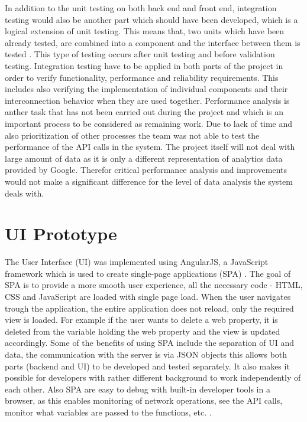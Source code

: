 In addition to the unit testing on both back end and front end, integration testing would also be another part which should have been developed, which is a logical extension of unit testing. This means that, two units which have been already tested, are combined into a component and the interface between them is tested \cite{Integ86:online}. This type of testing occurs after unit testing and before validation testing. Integration testing have to be applied in both parts of the project in order to verify functionality, performance and reliability requirements. This includes also verifying the implementation of individual components and their interconnection behavior when they are used together.
Performance analysis is anther task that has not been carried out during the project and which is an important process to be considered as remaining work. Due to lack of time and also prioritization of other processes the team was not able to test the performance of the API calls in the system. The project itself will not deal with large amount of data as it is only a different representation of analytics data provided by Google. Therefor critical performance analysis and improvements would not make a significant difference for the level of data analysis the system deals with.
\section{UI Prototype}
\label{sec:angularImpl}
The User Interface (UI) was implemented using AngularJS, a JavaScript framework which is used to create single-page applications (SPA) \cite{Angul93:online}.
The goal of SPA is to provide a more smooth user experience, all the necessary code - HTML, CSS and JavaScript are loaded with single page load. When the user navigates trough the application, the entire application does not reload, only the required view is loaded. For example if the user wants to delete a web property, it is deleted from the variable holding the web property and the view is updated accordingly. Some of the benefits of using SPA include the separation of UI and data, the communication with the server is via JSON objects this allows both parts (backend and UI) to be developed and tested separately. It also makes it possible for developers with rather different background to work independently of each other.
Also SPA are easy to debug with built-in developer tools in a browser, as this enables monitoring of network operations, see the API calls, monitor what variables are passed to the functions, etc. \cite{What51:online}.

